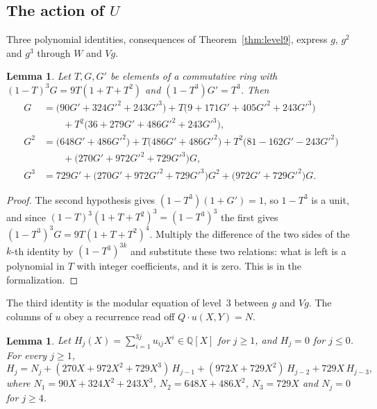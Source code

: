 \documentclass[11pt]{amsart}
\newtheorem{lemma}[theorem]{Lemma}
\theoremstyle{definition}
\numberwithin{equation}{section}
\newcommand{\lean}[1]{\ignorespaces}
\newcommand{\Q}{\mathbb{Q}}
\begin{document}
\subsection{The action of \texorpdfstring{$U$}{U}}
Three polynomial identities, consequences of Theorem~\ref{thm:level9}, express $g$, $g^2$ and $g^3$ through $W$ and $Vg$.

\begin{lemma}\label{lem:ring}\lean{CalegariSlopes.Bridge.Level9.ring_ME, CalegariSlopes.Bridge.Level9.ring_L1, CalegariSlopes.Bridge.Level9.ring_L2}
Let $T,G,G'$ be elements of a commutative ring with $(1-T)^3G=9T(1+T+T^2)$ and $(1-T^3)G'=T^3$. Then
\begin{align*}
G&=\bigl(90G'+324G'^2+243G'^3\bigr)+T\bigl(9+171G'+405G'^2+243G'^3\bigr)\\
&\qquad+T^2\bigl(36+279G'+486G'^2+243G'^3\bigr),\\
G^2&=\bigl(648G'+486G'^2\bigr)+T\bigl(486G'+486G'^2\bigr)+T^2\bigl(81-162G'-243G'^2\bigr)\\
&\qquad+\bigl(270G'+972G'^2+729G'^3\bigr)G,\\
G^3&=729G'+\bigl(270G'+972G'^2+729G'^3\bigr)G^2+\bigl(972G'+729G'^2\bigr)G.
\end{align*}
\end{lemma}

\begin{proof}
The second hypothesis gives $(1-T^3)(1+G')=1$, so $1-T^3$ is a unit, and since $(1-T)^3(1+T+T^2)^3=(1-T^3)^3$ the first gives $(1-T^3)^3G=9T(1+T+T^2)^4$. Multiply the difference of the two sides of the $k$-th identity by $(1-T^3)^{3k}$ and substitute these two relations: what is left is a polynomial in $T$ with integer coefficients, and it is zero. This is  in the formalization.
\end{proof}

The third identity is the modular equation of level~$3$ between $g$ and $Vg$. The columns of $u$ obey a recurrence read off $Q\cdot u(X,Y)=N$.

\begin{lemma}\label{lem:col}\lean{CalegariSlopes.Bridge.Level9.isColRec_col, CalegariSlopes.Bridge.Level9.isColRec_S, CalegariSlopes.Bridge.Level9.IsColRec.unique}
Let $H_j(X)=\sum_{i=1}^{3j}u_{ij}X^i\in\Q[X]$ for $j\ge1$, and $H_j=0$ for $j\le0$. For every $j\ge1$,
\[
H_j=N_j+(270X+972X^2+729X^3)\,H_{j-1}+(972X+729X^2)\,H_{j-2}+729X\,H_{j-3},
\]
where $N_1=90X+324X^2+243X^3$, $N_2=648X+486X^2$, $N_3=729X$ and $N_j=0$ for $j\ge4$.
\end{lemma}
\end{document}
